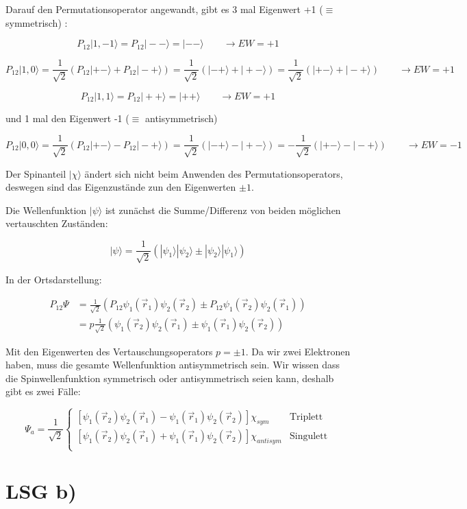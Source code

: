 Darauf den Permutationsoperator angewandt, gibt es 3 mal Eigenwert +1 (\(\equiv\) symmetrisch) :


\[P_{12}|1,-1 \rangle = P_{12}|--\rangle = |--\rangle  \qquad \rightarrow EW = +1  \]

\[ P_{12} |1,0\rangle = \frac{1}{\sqrt{2}}   (P_{12} |+-\rangle +  P_{12} |-+\rangle ) =\frac{1}{\sqrt{2}}   (|-+\rangle +  |+-\rangle ) =\frac{1}{\sqrt{2}}   (|+-\rangle +  |-+\rangle )  \qquad \rightarrow EW = +1 \]

\[P_{12}|1,1 \rangle = P_{12}|++\rangle = |++\rangle  \qquad \rightarrow EW = +1  \]

und 1 mal den Eigenwert -1 (\(\equiv\) antisymmetrisch)

\[ P_{12} |0,0\rangle = \frac{1}{\sqrt{2}}   (P_{12} |+-\rangle -  P_{12} |-+\rangle ) =\frac{1}{\sqrt{2}}   (|-+\rangle -  |+-\rangle ) =- \frac{1}{\sqrt{2}}   (|+-\rangle -  |-+\rangle )  \qquad \rightarrow EW = -1 \]

Der Spinanteil \(|\chi\rangle \) ändert sich nicht beim Anwenden des Permutationsoperators, deswegen sind das Eigenzustände zun den Eigenwerten \(\pm 1\).


Die Wellenfunktion \(|\psi\rangle \) ist zunächst die Summe/Differenz von beiden möglichen vertauschten Zuständen:

\[ |\psi\rangle = \frac{1}{\sqrt{2}} (|\psi_1\rangle |\psi_2\rangle \pm  |\psi_2\rangle |\psi_1\rangle)  \]

In der Ortsdarstellung:

\begin{align}
P_{12}\Psi &=   \frac{1}{\sqrt{2}} (P_{12} \psi_1(\vec r_1)\psi_2(\vec r_2)  \pm P_{12} \psi_1(\vec r_2) \psi_2(\vec r_1))   \\
&=  p  \frac{1}{\sqrt{2}} (  \psi_1(\vec r_2)\psi_2(\vec r_1)  \pm  \psi_1(\vec r_1) \psi_2(\vec r_2))  
\end{align}

Mit den Eigenwerten des Vertauschungsoperators \(p=\pm 1\). Da wir zwei Elektronen haben, muss die gesamte Wellenfunktion antisymmetrisch sein. Wir wissen dass die Spinwellenfunktion symmetrisch oder antisymmetrisch seien kann, deshalb gibt es zwei Fälle:

\[\boxed{\Psi_a = \frac{1}{\sqrt{2}} \begin{cases}
  [\psi_1(\vec r_2)\psi_2(\vec r_1)  - \psi_1(\vec r_1) \psi_2(\vec r_2)] \chi_{sym} & \text{Triplett}  \\
   [\psi_1(\vec r_2)\psi_2(\vec r_1)  + \psi_1(\vec r_1) \psi_2(\vec r_2)] \chi_{antisym} &\text{Singulett}  \\
\end{cases}}\]


\section*{LSG b)}







